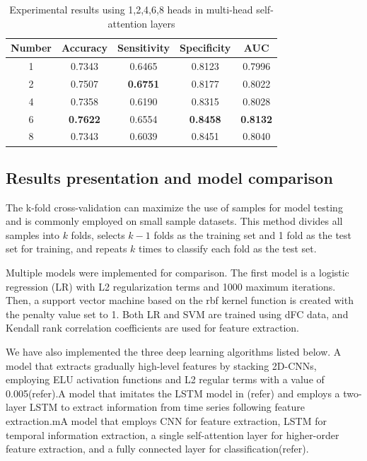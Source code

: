 \documentclass[a4paper]{cas-dc}
\begin{document}
\begin{table}[]
	\caption{Experimental results using 1,2,4,6,8 heads in multi-head self-attention layers}\label{Table3}
	\begin{tabular*}{\tblwidth}{@{}ccccc@{}}
		\toprule
		\textbf{Number}& \textbf{Accuracy} & \textbf{Sensitivity} & \textbf{Specificity} & \textbf{AUC} \\ %
		\midrule
		1                            & 0.7343                & 0.6465                   & 0.8123                   & 0.7996           \\
		2                             & 0.7507                & \textbf{0.6751}          & 0.8177                   & 0.8022           \\
		4                             & 0.7358                & 0.6190                   & 0.8315                   & 0.8028           \\
		6                             & \textbf{0.7622}       & 0.6554                   & \textbf{0.8458}          & \textbf{0.8132}  \\
		8                             & 0.7343                & 0.6039                   & 0.8451                   & 0.8040      \\
		\bottomrule
	\end{tabular*}
\end{table}
\subsection{Results presentation and model comparison}
The k-fold cross-validation can maximize the use of samples for model testing and is commonly employed on small sample datasets. This method divides all samples into $k$ folds, selects $k-1$ folds as the training set and 1 fold as the test set for training, and repeats $k$ times to classify each fold as the test set.

Multiple models were implemented for comparison. The first model is a logistic regression (LR) with L2 regularization terms and 1000 maximum iterations. Then, a support vector machine based on the rbf kernel function is created with the penalty value set to 1. Both LR and SVM are trained using dFC data, and Kendall rank correlation coefficients are used for feature extraction.

We have also implemented the three deep learning algorithms listed below. A model that extracts gradually high-level features by stacking 2D-CNNs, employing ELU activation functions and L2 regular terms with a value of 0.005(refer).A model that imitates the LSTM model in (refer) and employs a two-layer LSTM to extract information from time series following feature extraction.mA model that employs CNN for feature extraction, LSTM for temporal information extraction, a single self-attention layer for higher-order feature extraction, and a fully connected layer for classification(refer).
\end{document}
